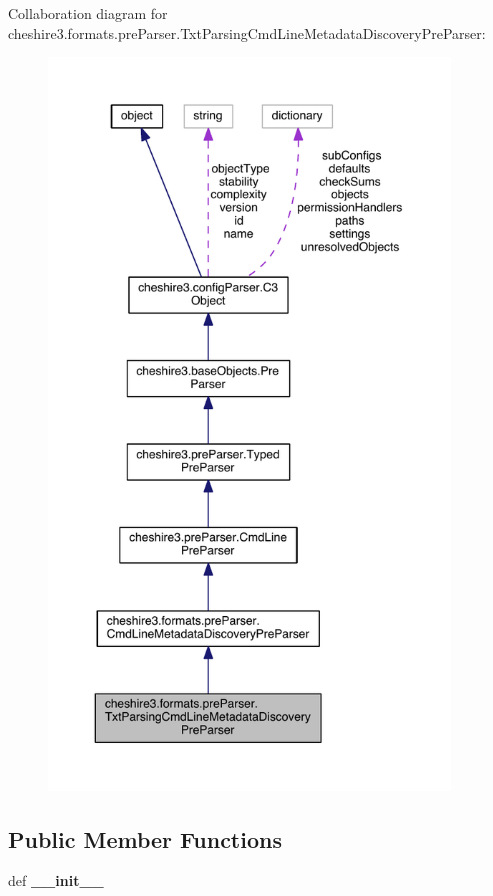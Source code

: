 Collaboration diagram for cheshire3.\-formats.\-pre\-Parser.\-Txt\-Parsing\-Cmd\-Line\-Metadata\-Discovery\-Pre\-Parser\-:
\nopagebreak
\begin{figure}[H]
\begin{center}
\leavevmode
\includegraphics[height=550pt]{classcheshire3_1_1formats_1_1pre_parser_1_1_txt_parsing_cmd_line_metadata_discovery_pre_parser__coll__graph}
\end{center}
\end{figure}
\subsection*{Public Member Functions}
\begin{DoxyCompactItemize}
\item 
\hypertarget{classcheshire3_1_1formats_1_1pre_parser_1_1_txt_parsing_cmd_line_metadata_discovery_pre_parser_af6cb7218206c778e9f80031db1f198a0}{def {\bfseries \-\_\-\-\_\-init\-\_\-\-\_\-}}\label{classcheshire3_1_1formats_1_1pre_parser_1_1_txt_parsing_cmd_line_metadata_discovery_pre_parser_af6cb7218206c778e9f80031db1f198a0}

\end{DoxyCompactItemize}
